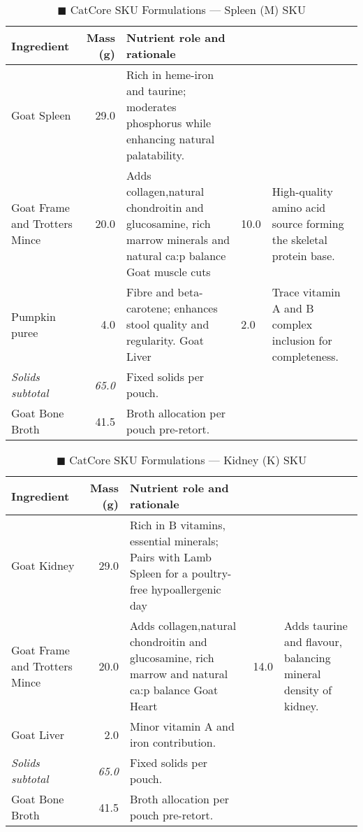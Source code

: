 \begin{table}[htbp]
\centering
\caption{\textcolor{darkbrown}{$\blacksquare$} CatCore SKU Formulations --- Spleen (M) SKU}
\label{tab:lamb_sku_3col}
\begin{adjustbox}{max width=\textwidth}
\begin{tabular}{@{}l r p{8.0cm}@{}}
\toprule
\textbf{Ingredient} & \textbf{Mass (g)} & \textbf{Nutrient role and rationale} \\
\midrule
Goat Spleen & 29.0 & Rich in heme-iron and taurine; moderates phosphorus while enhancing natural palatability. \\[3pt]
Goat Frame and Trotters Mince & 20.0 & Adds collagen,natural chondroitin and glucosamine, rich marrow minerals and natural ca:p balance
Goat muscle cuts & 10.0 & High-quality amino acid source forming the skeletal protein base. \\[3pt]
Pumpkin puree & 4.0 & Fibre and beta-carotene; enhances stool quality and regularity. 
Goat Liver & 2.0 & Trace vitamin A and B complex inclusion for completeness. \\[3pt]
\textit{Solids subtotal} & \textit{65.0} & Fixed solids per pouch. \\[3pt]
Goat Bone Broth & 41.5 & Broth allocation per pouch pre-retort. \\[3pt]
\bottomrule
\end{tabular}
\end{adjustbox}
\end{table}


\begin{table}[htbp]
\centering
\caption{\textcolor{darkbrown}{$\blacksquare$} CatCore SKU Formulations --- Kidney (K) SKU}
\label{tab:kidney_sku_3col}
\begin{adjustbox}{max width=\textwidth}
\begin{tabular}{@{}l r p{8.0cm}@{}}
\toprule
\textbf{Ingredient} & \textbf{Mass (g)} & \textbf{Nutrient role and rationale} \\
\midrule
Goat Kidney & 29.0 & Rich in B vitamins, essential minerals; Pairs with Lamb Spleen for a poultry-free hypoallergenic day \\[3pt]
Goat Frame and Trotters Mince & 20.0 & Adds collagen,natural chondroitin and glucosamine, rich marrow and natural ca:p balance
Goat Heart & 14.0 & Adds taurine and flavour, balancing mineral density of kidney. \\[3pt]
Goat Liver & 2.0 & Minor vitamin A and iron contribution. \\[3pt]
\textit{Solids subtotal} & \textit{65.0} & Fixed solids per pouch. \\[3pt]
Goat Bone Broth & 41.5 & Broth allocation per pouch pre-retort. \\[3pt]
\bottomrule
\end{tabular}
\end{adjustbox}
\end{table}
\vspace{1em}

